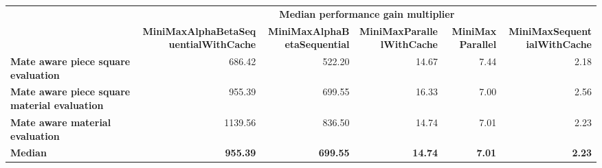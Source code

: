 \begin{tabular}{|p{8cm}|*{5}{r|}}
    \hline
    \rowcolor{lightgray}
    & \multicolumn{5}{c|}{\textbf{Median performance gain multiplier}} \\
    \cline{2-6}
    \rowcolor{lightgray}
    \multirow{-2}{*}{\parbox{8cm}{\centering\textbf{Strategy}}} & \multicolumn{1}{r|}{\textbf{MiniMaxAlphaBetaSequentialWithCache}} & \multicolumn{1}{r|}{\textbf{MiniMaxAlphaBetaSequential}} & \multicolumn{1}{r|}{\textbf{MiniMaxParallelWithCache}} & \multicolumn{1}{r|}{\textbf{MiniMaxParallel}} & \multicolumn{1}{r|}{\textbf{MiniMaxSequentialWithCache}} \\
    \hline
    \rowcolor[HTML]{FFFFFF}
    \textbf{Mate aware piece square evaluation}                 & 686.42                                                            & 522.20                                                   & 14.67                                                  & 7.44                                          & 2.18                                                     \\

    \rowcolor[HTML]{EFEFEF}
    \textbf{Mate aware piece square material evaluation}        & 955.39                                                            & 699.55                                                   & 16.33                                                  & 7.00                                          & 2.56                                                     \\

    \rowcolor[HTML]{FFFFFF}
    \textbf{Mate aware material evaluation}                     & 1139.56                                                           & 836.50                                                   & 14.74                                                  & 7.01                                          & 2.23                                                     \\
    \hline
    \hline
    \rowcolor[HTML]{FFFFFF}
    \textbf{Median}                                             & \textbf{955.39}                                                   & \textbf{699.55}                                          & \textbf{14.74}                                         & \textbf{7.01}                                 & \textbf{2.23}                                            \\

    \hline
\end{tabular}%
